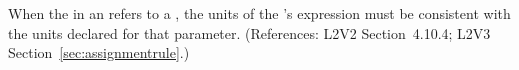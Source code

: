 When the  in an \InitialAssignment refers to a \Parameter,
the units of the \InitialAssignment's  expression must be
consistent with the units declared for that parameter.  (References: L2V2
Section~4.10.4; L2V3 Section~\ref{sec:assignmentrule}.)
